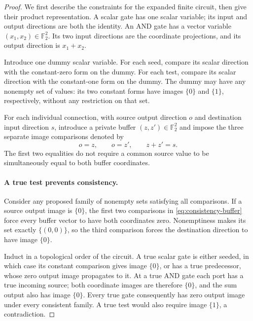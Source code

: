 \documentclass[11pt]{article}
\theoremstyle{definition}
\begin{document}
\begin{proof}
We first describe the constraints for the expanded finite circuit, then
give their product representation. A scalar gate has one scalar variable;
its input and output directions are both the identity. An AND gate has
a vector variable $(x_1,x_2)\in\mathbb F_2^2$. Its two input directions are the
coordinate projections, and its output direction is $x_1+x_2$.

Introduce one dummy scalar variable. For each seed, compare its scalar
direction with the constant-zero form on the dummy. For each test, compare
its scalar direction with the constant-one form on the dummy. The dummy
may have any nonempty set of values: its two constant forms have images
$\{0\}$ and $\{1\}$, respectively, without any restriction on that set.

For each individual connection, with source output direction $o$ and
destination input direction $s$, introduce a private buffer
$(z,z')\in\mathbb F_2^2$ and impose the three separate image comparisons denoted by
\begin{equation}\label{eq:consistency-buffer}
 o=z,\qquad o=z',\qquad z+z'=s.
\end{equation}
The first two equalities do not require a common source value to be
simultaneously equal to both buffer coordinates.

\paragraph{A true test prevents consistency.}
Consider any proposed family of nonempty sets satisfying all comparisons.
If a source output image is $\{0\}$, the first two comparisons in
\eqref{eq:consistency-buffer} force every buffer vector to have both
coordinates zero. Nonemptiness makes its set exactly $\{(0,0)\}$, so
the third comparison forces the destination direction to have image
$\{0\}$.

Induct in a topological order of the circuit. A true scalar gate is either
seeded, in which case its constant comparison gives image $\{0\}$, or
has a true predecessor, whose zero output image propagates to it. At a
true AND gate each port has a true incoming source; both coordinate images
are therefore $\{0\}$, and the sum output also has image $\{0\}$.
Every true gate consequently has zero output image under every consistent
family. A true test would also require image $\{1\}$, a contradiction.


\end{proof}
\end{document}
